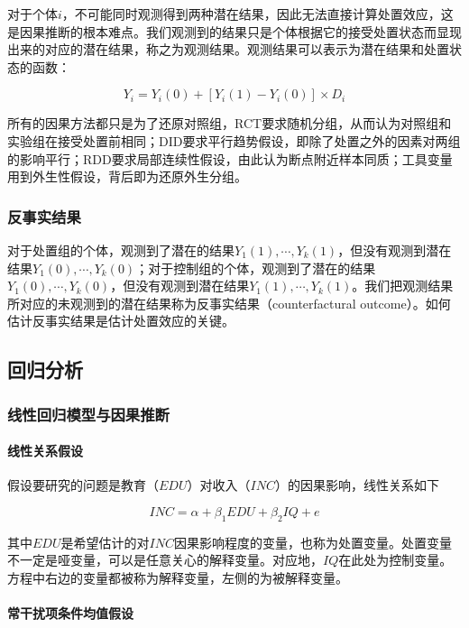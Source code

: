 \documentclass[11pt,a4paper]{ctexart}
\begin{document}
对于个体\(i\)，不可能同时观测得到两种潜在结果，因此无法直接计算处置效应，这是因果推断的根本难点。我们观测到的结果只是个体根据它的接受处置状态而显现出来的对应的潜在结果，称之为观测结果。观测结果可以表示为潜在结果和处置状态的函数：

\[Y_i=Y_i(0)+[Y_i(1)-Y_i(0)]\times D_i\]

所有的因果方法都只是为了还原对照组，RCT要求随机分组，从而认为对照组和实验组在接受处置前相同；DID要求平行趋势假设，即除了处置之外的因素对两组的影响平行；RDD要求局部连续性假设，由此认为断点附近样本同质；工具变量用到外生性假设，背后即为还原外生分组。

\subsubsection{反事实结果}

对于处置组的个体，观测到了潜在的结果\(Y_1(1),\cdots,Y_k(1)\)，但没有观测到潜在结果\(Y_1(0),\cdots,Y_k(0)\)；对于控制组的个体，观测到了潜在的结果\(Y_1(0),\cdots,Y_k(0)\)，但没有观测到潜在结果\(Y_1(1),\cdots,Y_k(1)\)。我们把观测结果所对应的未观测到的潜在结果称为反事实结果（counterfactural
outcome）。如何估计反事实结果是估计处置效应的关键。

\subsection{回归分析}

\subsubsection{线性回归模型与因果推断}

\paragraph{线性关系假设}

假设要研究的问题是教育（\(EDU\)）对收入（\(INC\)）的因果影响，线性关系如下

\[INC=\alpha+\beta_1 EDU+\beta_2 IQ+e\]

其中\(EDU\)是希望估计的对\(INC\)因果影响程度的变量，也称为处置变量。处置变量不一定是哑变量，可以是任意关心的解释变量。对应地，\(IQ\)在此处为控制变量。方程中右边的变量都被称为解释变量，左侧的为被解释变量。

\paragraph{常干扰项条件均值假设}
\end{document}
